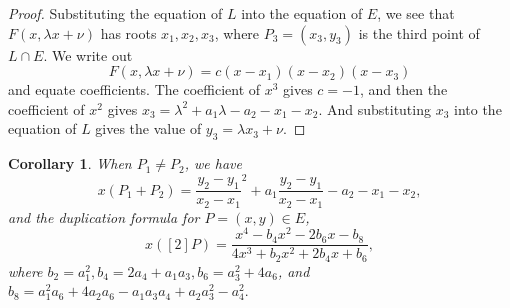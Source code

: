 \documentclass[12pt]{article}
\newtheorem{corollary}{Corollary}[subsection]
\theoremstyle{remark}
\theoremstyle{definition}
\begin{document}
    \begin{proof}
        Substituting the equation of $L$ into the equation of $E$, we see that $F(x,\lambda x+\nu )$ has roots $x_1,x_2,x_3$, where $P_3=(x_3,y_3)$ is the third point of $L\cap E$. We write out $$F(x,\lambda x+\nu )=c(x-x_1)(x-x_2)(x-x_3)$$ and equate coefficients. The coefficient of $x^3$ gives $c=-1$, and then the coefficient of $x^2$ gives $x_3=\lambda ^2 +a_1\lambda -a_2-x_1-x_2$. And substituting $x_3$ into the equation of $L$ gives the value of $y_3=\lambda x_3+\nu .$
    \end{proof}
    \begin{corollary}\label{corollary-dup-formula}
        When $P_1\neq P_2$, we have $$x(P_1+P_2)=\frac{y_2-y_1}{x_2-x_1}^2+a_1\frac{y_2-y_1}{x_2-x_1}-a_2-x_1-x_2,$$ and the \textup{duplication formula} for $P=(x,y)\in E$, $$x([2]P)=\frac{x^4-b_4x^2-2b_6x-b_8}{4x^3+b_2x^2+2b_4x+b_6},$$ where $b_2=a_1^2,b_4=2a_4+a_1a_3, b_6=a_3^2+4a_6$, and $ b_8=a_1^2a_6+4a_2a_6-a_1a_3a_4+a_2a_3^2-a_4^2.$
    \end{corollary}
    
    
    
\end{document}
